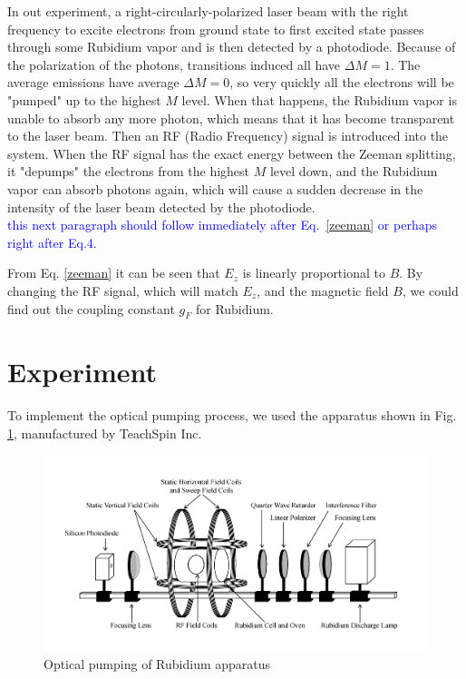 \documentclass[prb,preprint]{revtex4-1}
\begin{document}
In out experiment, a right-circularly-polarized laser beam with the right frequency to excite electrons from ground state to first excited state passes through some Rubidium vapor and is then detected by a photodiode. Because of the polarization of the photons, transitions induced all have $\Delta M=1$. The average emissions have average $\Delta M=0$, so very quickly all the electrons will be "pumped" up to the highest $M$ level. When that happens, the Rubidium vapor is unable to absorb any more photon, which means that it has become transparent to the laser beam. Then an RF (Radio Frequency) signal is introduced into the system. When the RF signal has the exact energy between the Zeeman splitting, it "depumps" the electrons from the highest $M$ level down, and the Rubidium vapor can absorb photons again, which will cause a sudden decrease in the intensity of the laser beam detected by the photodiode. \\

\textcolor{blue}{this next paragraph should follow immediately after Eq.~\eqref{zeeman} or perhaps right after Eq.4.  }

From Eq. \eqref{zeeman} it can be seen that $E_{z}$ is linearly proportional to $B$. By changing the RF signal, which will match $E_{z}$, and the magnetic field $B$, we could find out the coupling constant $g_{F}$ for Rubidium.\\

\section{Experiment}

To implement the optical pumping process, we used the apparatus shown in Fig. 
\ref{exp}, manufactured by TeachSpin Inc. \\

\begin{figure}[h]
\centering
\includegraphics[width=16cm]{exp.jpg}
\caption{Optical pumping of Rubidium apparatus}
\label{exp}
\end{figure}
\end{document}
